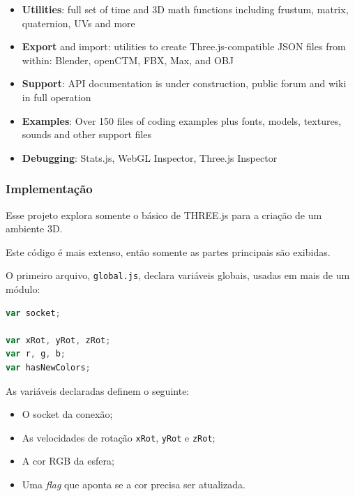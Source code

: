 \documentclass[a4paper,12pt]{article}
\newcommand{\code}[1]{\lstinline[mathescape=true, columns=fixed, basicstyle={\small\ttfamily}]{#1}}
\begin{document}
\begin{itemize}
  \item \textbf{Utilities}: full set of time and 3D math functions including frustum, matrix, quaternion, UVs and more

  \item \textbf{Export} and import: utilities to create Three.js-compatible JSON files from within: Blender, openCTM, FBX, Max, and OBJ

  \item \textbf{Support}: API documentation is under construction, public forum and wiki in full operation

  \item \textbf{Examples}: Over 150 files of coding examples plus fonts, models, textures, sounds and other support files

  \item \textbf{Debugging}: Stats.js, WebGL Inspector, Three.js Inspector
\end{itemize}


\subsubsection{Implementação}

Esse projeto explora somente o básico de THREE.js para a criação de um ambiente 3D.

Este código é mais extenso, então somente as partes principais são exibidas.

O primeiro arquivo, \code{global.js}, declara variáveis globais, usadas em mais de um módulo:


\begin{lstlisting}[language=JavaScript]
var socket;

var xRot, yRot, zRot;
var r, g, b;
var hasNewColors;
\end{lstlisting}

As variáveis declaradas definem o seguinte:

\begin{itemize}
  \item O socket da conexão;

  \item As velocidades de rotação \code{xRot}, \code{yRot} e \code{zRot};

  \item A cor RGB da esfera;

  \item Uma \emph{flag} que aponta se a cor precisa ser atualizada.
\end{itemize}
\end{document}
